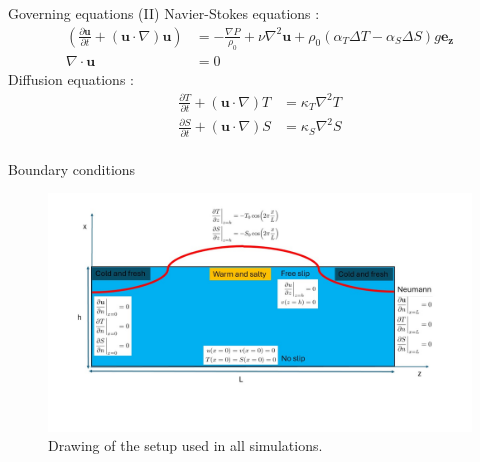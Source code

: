\documentclass[10pt]{beamer}
\begin{document}
\begin{frame}{Governing equations (II)}
  Navier-Stokes equations :
  \begin{equation}
    \begin{aligned}
      \left(\frac{\partial\mathbf{u}}{\partial t} + (\mathbf{u}\cdot\nabla)\mathbf{u}\right) & = -\frac{\nabla P}{\rho _0} + \nu\nabla^2\mathbf{u} + \rho_0\left(\alpha_T \Delta T - \alpha_S \Delta S \right) g\mathbf{e_z} \\
      \nabla\cdot\mathbf{u}                                                                  & = 0\end{aligned}
  \end{equation}
  Diffusion equations :
  \begin{equation}
    \begin{aligned}
      \frac{\partial T}{\partial t} + (\mathbf{u}\cdot\nabla)T & = \kappa_T \nabla^2T \\
      \frac{\partial S}{\partial t} + (\mathbf{u}\cdot\nabla)S & = \kappa_S \nabla^2S \\
    \end{aligned}
  \end{equation}


\end{frame}
\begin{frame}{Boundary conditions}
  \begin{figure}[ht]
    \centering
    \includegraphics[width=1.\textwidth]{images/drawing_setup.jpg}
    \caption{Drawing of the setup used in all simulations.}
    \label{fig:setup}
  \end{figure}
\end{frame}
\end{document}
